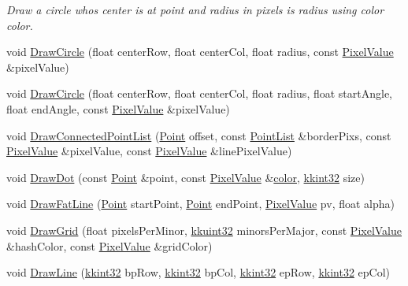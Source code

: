 \begin{DoxyCompactItemize}
\begin{DoxyCompactList}\small\item\em Draw a circle who\textquotesingle{}s center is at \textquotesingle{}point\textquotesingle{} and radius in pixels is \textquotesingle{}radius\textquotesingle{} using color \textquotesingle{}color\textquotesingle{}. \end{DoxyCompactList}\item 
void \hyperlink{class_k_k_b_1_1_raster_a4c2bf896887fa1bb0413d78ea4f58cbe}{Draw\+Circle} (float center\+Row, float center\+Col, float radius, const \hyperlink{class_k_k_b_1_1_pixel_value}{Pixel\+Value} \&pixel\+Value)
\item 
void \hyperlink{class_k_k_b_1_1_raster_af1c00ed51760513b1ec1be5a7418a96d}{Draw\+Circle} (float center\+Row, float center\+Col, float radius, float start\+Angle, float end\+Angle, const \hyperlink{class_k_k_b_1_1_pixel_value}{Pixel\+Value} \&pixel\+Value)
\item 
void \hyperlink{class_k_k_b_1_1_raster_a508adfee4d3a801d193390bb53bbe2fa}{Draw\+Connected\+Point\+List} (\hyperlink{class_k_k_b_1_1_point}{Point} offset, const \hyperlink{class_k_k_b_1_1_point_list}{Point\+List} \&border\+Pixs, const \hyperlink{class_k_k_b_1_1_pixel_value}{Pixel\+Value} \&pixel\+Value, const \hyperlink{class_k_k_b_1_1_pixel_value}{Pixel\+Value} \&line\+Pixel\+Value)
\item 
void \hyperlink{class_k_k_b_1_1_raster_aeaf39a193318e5d9cef06f736fc97f7e}{Draw\+Dot} (const \hyperlink{class_k_k_b_1_1_point}{Point} \&point, const \hyperlink{class_k_k_b_1_1_pixel_value}{Pixel\+Value} \&\hyperlink{class_k_k_b_1_1_raster_a482384d89cc53fa4f36276307c746854}{color}, \hyperlink{namespace_k_k_b_a8fa4952cc84fda1de4bec1fbdd8d5b1b}{kkint32} size)
\item 
void \hyperlink{class_k_k_b_1_1_raster_a3bfd7c65bbcc718997607651d9a2d043}{Draw\+Fat\+Line} (\hyperlink{class_k_k_b_1_1_point}{Point} start\+Point, \hyperlink{class_k_k_b_1_1_point}{Point} end\+Point, \hyperlink{class_k_k_b_1_1_pixel_value}{Pixel\+Value} pv, float alpha)
\item 
void \hyperlink{class_k_k_b_1_1_raster_a7a954cb16dc7d0f651ee95bb2483d38c}{Draw\+Grid} (float pixels\+Per\+Minor, \hyperlink{namespace_k_k_b_af8d832f05c54994a1cce25bd5743e19a}{kkuint32} minors\+Per\+Major, const \hyperlink{class_k_k_b_1_1_pixel_value}{Pixel\+Value} \&hash\+Color, const \hyperlink{class_k_k_b_1_1_pixel_value}{Pixel\+Value} \&grid\+Color)
\item 
void \hyperlink{class_k_k_b_1_1_raster_a118bf0fa32356ddea42f579c044c65cd}{Draw\+Line} (\hyperlink{namespace_k_k_b_a8fa4952cc84fda1de4bec1fbdd8d5b1b}{kkint32} bp\+Row, \hyperlink{namespace_k_k_b_a8fa4952cc84fda1de4bec1fbdd8d5b1b}{kkint32} bp\+Col, \hyperlink{namespace_k_k_b_a8fa4952cc84fda1de4bec1fbdd8d5b1b}{kkint32} ep\+Row, \hyperlink{namespace_k_k_b_a8fa4952cc84fda1de4bec1fbdd8d5b1b}{kkint32} ep\+Col)

\end{DoxyCompactItemize}
